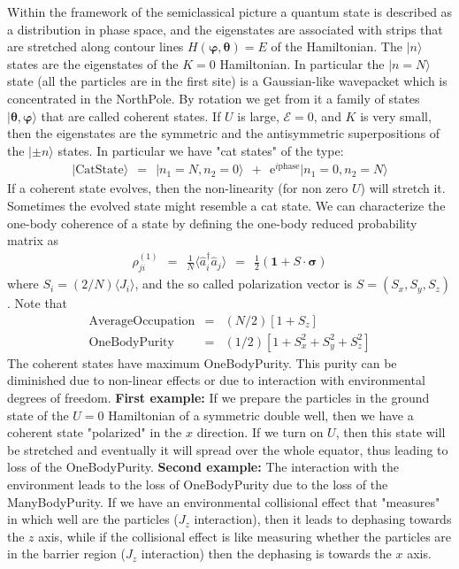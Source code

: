 \documentclass[onecolumn,fleqn]{revtex4}
\newcommand{\eexp}{\mathrm{e}^}
\newcommand{\varphiJ}{\bm{\varphi}}
\newcommand{\thetaJ}{\bm{\theta}}
\newcommand{\beq}{\begin{eqnarray}}
\newcommand{\eeq}{\end{eqnarray}}
\begin{document}
Within the framework of the semiclassical picture 
a quantum state is described as a distribution 
in phase space, and the eigenstates are associated 
with strips that are stretched along 
contour lines ${H(\varphiJ,\thetaJ)=E}$ of the Hamiltonian. 
The $|n\rangle$ states are the eigenstates of the $K=0$ Hamiltonian. 
In particular the ${|n{=}N\rangle}$ state (all the particles are in the first site) 
is a Gaussian-like wavepacket which is concentrated in the NorthPole. 
By rotation we get from it a family of states ${|\thetaJ,\varphiJ\rangle}$
that are called coherent states. 
If $U$ is large, $\mathcal{E}=0$, and $K$ is very small, 
then the eigenstates are the symmetric and the antisymmetric 
superpositions of the $|\pm n\rangle$ states.  
In particular we have "cat states" of the type:
\beq
| \mbox{CatState} \rangle \ \ = \ \ |n_1{=}N,n_2{=}0\rangle \ \ + \ \ \eexp{i\mbox{phase}} |n_1{=}0,n_2{=}N\rangle 
\eeq
If a coherent state evolves, then the non-linearity (for non zero $U$) 
will stretch it. Sometimes the evolved state might resemble a cat state.
We can characterize the one-body coherence of a state 
by defining the one-body reduced probability matrix as 
\beq
\rho^{(1)}_{ji} 
\ \ = \ \  \frac{1}{N}\langle \hat{a}_i^{\dagger} \hat{a}_j \rangle   
\ \ = \ \  \frac{1}{2}(\bm{1} +  S \cdot \bm{\sigma}) 
\eeq
where  ${S_i=(2/N)\langle J_i \rangle}$, and the so called polarization vector 
is ${S = ( S_x,  S_y, S_z)}$. Note that
\beq
\mbox{AverageOccupation} &=& (N/2)\left[ 1 + S_z \right]
\\
\mbox{OneBodyPurity} &=&  (1/2) \left[ 1 + S_x^2 + S_y^2 + S_z^2 \right]
\eeq
The coherent states have maximum OneBodyPurity. 
This purity can be diminished due to 
non-linear effects or due to interaction 
with environmental degrees of freedom.  
{\bf First example:} 
If we prepare the particles in the ground state 
of the ${U=0}$ Hamiltonian of a symmetric double well, 
then we have a coherent state "polarized" in the $x$ direction.
If we turn on $U$, then this state will be stretched 
and eventually it will spread over the whole equator, 
thus leading to loss of the OneBodyPurity.
{\bf Second example:} 
The interaction with the environment leads 
to the loss of OneBodyPurity due to the loss of the ManyBodyPurity. 
If we have an environmental collisional effect that 
"measures" in which well are the particles ($J_z$ interaction), 
then it leads to dephasing towards the $z$ axis, 
while if the collisional effect is like measuring whether 
the particles are in the barrier region  ($J_z$ interaction) 
then the dephasing is towards the $x$ axis. 
\end{document}
